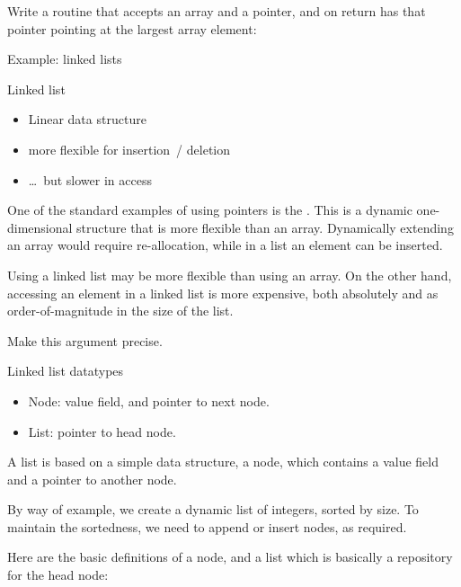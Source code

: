 \begin{exercise}
  Write a routine that accepts an array and a pointer, and on return
  has that pointer pointing at the largest array element:
\end{exercise}

 {Example: linked lists}

\begin{block}{Linked list}
  \begin{itemize}
  \item Linear data structure
  \item more flexible for insertion~/ deletion
  \item \ldots~but slower in access
  \end{itemize}
\end{block}

One of the standard examples of using pointers is the
. This is a dynamic one-dimensional structure
that is more flexible than an array. Dynamically extending an array
would require re-allocation, while in a list an element can be
inserted.

\begin{exercise}
  Using a linked list may be more flexible than using an array.
  On the other hand, accessing an element in a linked list is
  more expensive, both absolutely and as order-of-magnitude in the size
  of the list.

  Make this argument precise.
\end{exercise}

\begin{block}{Linked list datatypes}
  \begin{itemize}
  \item Node: value field, and pointer to next node.
  \item List: pointer to head node.
  \end{itemize}
\end{block}

A list is based on a simple data structure, a node, which contains a
value field and a pointer to another node.

By way of example, we create a dynamic list of integers, sorted by
size. To maintain the sortedness, we need to append or insert nodes,
as required.

Here are the basic definitions of a node, and a list which is
basically a repository for the head node:
%

